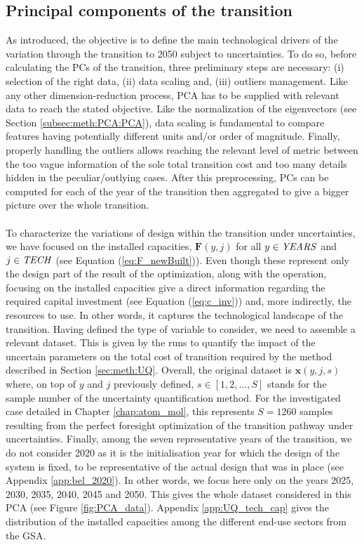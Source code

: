 \subsection{Principal components of the transition}
\label{subsec:meth:PCA:transition}
As introduced, the objective is to define the main technological drivers of the variation through the transition to 2050 subject to uncertainties. To do so, before calculating the PCs of the transition, three preliminary steps are necessary: (i) selection of the right data, (ii) data scaling and, (iii) outliers management. Like any other dimension-reduction process, \gls{PCA} has to be supplied with relevant data to reach the stated objective.  Like the normalization of the eigenvectors (see Section \ref{subsec:meth:PCA:PCA}), data scaling is fundamental to compare features having potentially different units and/or order of magnitude. Finally, properly handling the outliers allows reaching the relevant level of metric between the too vague information of the sole total transition cost and too many details hidden in the peculiar/outlying cases. After this preprocessing, PCs can be computed for each of the year of the transition then aggregated to give a bigger picture over the whole transition.\\

\\

\noindent
To characterize the variations of design within the transition under uncertainties, we have focused on the installed capacities, $\textbf{F}(y,j)$ for all $y \in \text{\emph{YEARS}}$ and $j \in \text{\emph{TECH}}$ (see Equation (\ref{eq:F_newBuilt})). Even though these represent only the design part of the result of the optimization, along with the operation, focusing on the installed capacities give a direct information regarding the required capital investment (see Equation (\ref{eq:c_inv})) and, more indirectly, the resources to use.  In other words, it captures the technological landscape of the transition.  Having defined the type of variable to consider, we need to assemble a relevant dataset. This is given by the runs to quantify the impact of the uncertain parameters on the total cost of transition required by the method described in Section \ref{sec:meth:UQ}. Overall, the original dataset is $\textbf{x}(y,j,s)$ where, on top of $y$ and $j$ previously defined, $s \in [1,2,...,S]$ stands for the sample number of the uncertainty quantification method. For the investigated case detailed in Chapter \ref{chap:atom_mol}, this represents $S=1260$ samples resulting from the perfect foresight optimization of the transition pathway under uncertainties. Finally, among the seven representative years of the transition, we do not consider 2020 as it is the initialisation year for which the design of the system is fixed, to be representative of the actual design that was in place (see Appendix \ref{app:bel_2020}). In other words, we focus here only on the years 2025, 2030, 2035, 2040, 2045 and 2050. This gives the whole dataset considered in this \gls{PCA} (see Figure \ref{fig:PCA_data}). Appendix \ref{app:UQ_tech_cap} gives the distribution of the installed capacities among the different end-use sectors from the \gls{GSA}.\\

